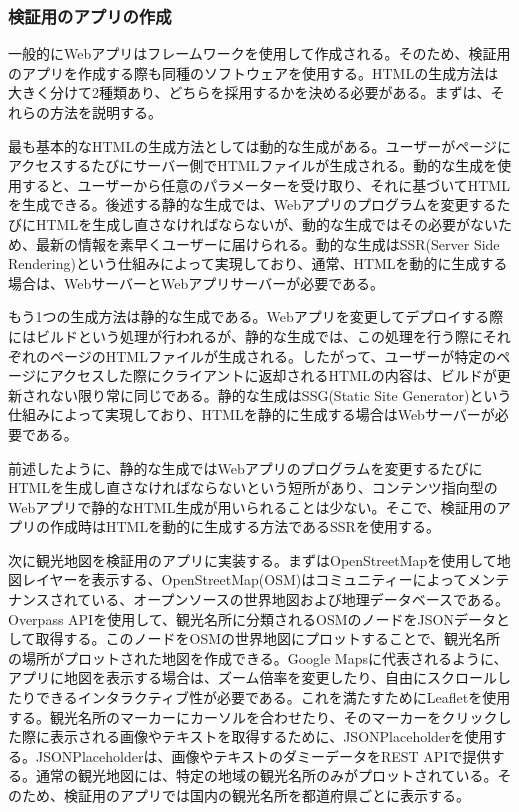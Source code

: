 \subsubsection{検証用のアプリの作成}\label{subsubsection:検証用のアプリの作成}
一般的にWebアプリはフレームワークを使用して作成される。そのため、検証用のアプリを作成する際も同種のソフトウェアを使用する。HTMLの生成方法は大きく分けて2種類あり、どちらを採用するかを決める必要がある。まずは、それらの方法を説明する。

最も基本的なHTMLの生成方法としては動的な生成がある。ユーザーがページにアクセスするたびにサーバー側でHTMLファイルが生成される。動的な生成を使用すると、ユーザーから任意のパラメーターを受け取り、それに基づいてHTMLを生成できる。後述する静的な生成では、Webアプリのプログラムを変更するたびにHTMLを生成し直さなければならないが、動的な生成ではその必要がないため、最新の情報を素早くユーザーに届けられる。動的な生成はSSR(Server Side Rendering)という仕組みによって実現しており、通常、HTMLを動的に生成する場合は、WebサーバーとWebアプリサーバーが必要である。

もう1つの生成方法は静的な生成である。Webアプリを変更してデプロイする際にはビルドという処理が行われるが、静的な生成では、この処理を行う際にそれぞれのページのHTMLファイルが生成される。したがって、ユーザーが特定のページにアクセスした際にクライアントに返却されるHTMLの内容は、ビルドが更新されない限り常に同じである。静的な生成はSSG(Static Site Generator)という仕組みによって実現しており、HTMLを静的に生成する場合はWebサーバーが必要である。

前述したように、静的な生成ではWebアプリのプログラムを変更するたびにHTMLを生成し直さなければならないという短所があり、コンテンツ指向型のWebアプリで静的なHTML生成が用いられることは少ない。そこで、検証用のアプリの作成時はHTMLを動的に生成する方法であるSSRを使用する。

次に観光地図を検証用のアプリに実装する。まずはOpenStreetMapを使用して地図レイヤーを表示する、OpenStreetMap(OSM)はコミュニティーによってメンテナンスされている、オープンソースの世界地図および地理データベースである。Overpass APIを使用して、観光名所に分類されるOSMのノードをJSONデータとして取得する。このノードをOSMの世界地図にプロットすることで、観光名所の場所がプロットされた地図を作成できる。Google Mapsに代表されるように、アプリに地図を表示する場合は、ズーム倍率を変更したり、自由にスクロールしたりできるインタラクティブ性が必要である。これを満たすためにLeafletを使用する。観光名所のマーカーにカーソルを合わせたり、そのマーカーをクリックした際に表示される画像やテキストを取得するために、JSONPlaceholderを使用する。JSONPlaceholderは、画像やテキストのダミーデータをREST APIで提供する。通常の観光地図には、特定の地域の観光名所のみがプロットされている。そのため、検証用のアプリでは国内の観光名所を都道府県ごとに表示する。
